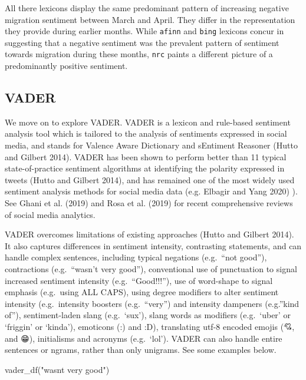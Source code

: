 \documentclass[
  letterpaper,
  DIV=11,
  numbers=noendperiod]{scrreprt}
\newenvironment{Shaded}{\begin{snugshade}}{\end{snugshade}}
\newcommand{\FunctionTok}[1]{\textcolor[rgb]{0.28,0.35,0.67}{#1}}
\newcommand{\NormalTok}[1]{\textcolor[rgb]{0.00,0.23,0.31}{#1}}
\newcommand{\StringTok}[1]{\textcolor[rgb]{0.13,0.47,0.30}{#1}}
\begin{document}
All there lexicons display the same predominant pattern of increasing
negative migration sentiment between March and April. They differ in the
representation they provide during earlier months. While \texttt{afinn}
and \texttt{bing} lexicons concur in suggesting that a negative
sentiment was the prevalent pattern of sentiment towards migration
during these months, \texttt{nrc} paints a different picture of a
predominantly positive sentiment.

\hypertarget{vader}{%
\subsection{VADER}\label{vader}}

We move on to explore VADER. VADER is a lexicon and rule-based sentiment
analysis tool which is tailored to the analysis of sentiments expressed
in social media, and stands for Valence Aware Dictionary and sEntiment
Reasoner (Hutto and Gilbert 2014). VADER has been shown to perform
better than 11 typical state-of-practice sentiment algorithms at
identifying the polarity expressed in tweets (Hutto and Gilbert 2014),
and has remained one of the most widely used sentiment analysis methods
for social media data (e.g. Elbagir and Yang 2020) ). See Ghani et al.
(2019) and Rosa et al. (2019) for recent comprehensive reviews of social
media analytics.

VADER overcomes limitations of existing approaches (Hutto and Gilbert
2014). It also captures differences in sentiment intensity, contrasting
statements, and can handle complex sentences, including typical
negations (e.g.~``not good''), contractions (e.g.~``wasn't very good''),
conventional use of punctuation to signal increased sentiment intensity
(e.g.~``Good!!!''), use of word-shape to signal emphasis (e.g.~using ALL
CAPS), using degree modifiers to alter sentiment intensity
(e.g.~intensity boosters (e.g.~``very'') and intensity dampeners
(e.g.''kind of''), sentiment-laden slang (e.g.~`sux'), slang words as
modifiers (e.g.~`uber' or `friggin' or `kinda'), emoticons (:) and :D),
translating utf-8 encoded emojis (💘, 💋 and 😁), initialisms and
acronyms (e.g.~`lol'). VADER can also handle entire sentences or ngrams,
rather than only unigrams. See some examples below.

\begin{Shaded}
\begin{Highlighting}[]
\FunctionTok{vader\_df}\NormalTok{(}\StringTok{"wasn\textquotesingle{}t very good"}\NormalTok{)}
\end{Highlighting}
\end{Shaded}
\end{document}
